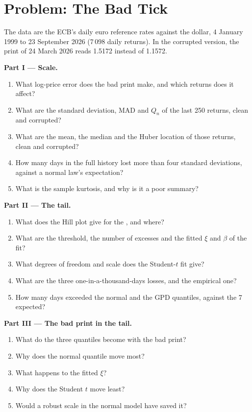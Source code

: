 \section{Problem: The Bad Tick}

\begin{problem}\label{pb:qm:robust-statistics-and-heavy-tails:1}
The data are the ECB's daily euro reference rates against the dollar, 4 January 1999 to 23 September 2026 (7\,098 daily returns). In the
corrupted version, the print of 24 March 2026 reads 1.5172 instead of 1.1572.

\medskip\noindent\textbf{Part I --- Scale.}
\begin{enumerate}
\item What log-price error does the bad print make, and which returns does it affect?
\item What are the standard deviation, MAD and $Q_n$ of the last 250 returns, clean and corrupted?
\item What are the mean, the median and the Huber location of those returns, clean and corrupted?
\item How many days in the full history lost more than four standard deviations, against a normal law's expectation?
\item What is the sample kurtosis, and why is it a poor summary?
\end{enumerate}

\medskip\noindent\textbf{Part II --- The tail.}
\begin{enumerate}[resume]
\item What does the Hill plot give for the , and where?
\item What are the threshold, the number of excesses and the fitted $\xi$ and $\beta$ of the  fit?
\item What degrees of freedom and scale does the Student-$t$ fit give?
\item What are the three one-in-a-thousand-days losses, and the empirical one?
\item How many days exceeded the normal and the GPD quantiles, against the 7 expected?
\end{enumerate}

\medskip\noindent\textbf{Part III --- The bad print in the tail.}
\begin{enumerate}[resume]
\item What do the three quantiles become with the bad print?
\item Why does the normal quantile move most?
\item What happens to the fitted $\xi$?
\item Why does the Student $t$ move least?
\item Would a robust scale in the normal model have saved it?
\end{enumerate}


\end{problem}
